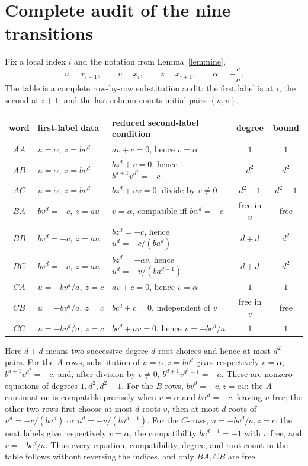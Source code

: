 \documentclass[11pt]{article}
\theoremstyle{definition}
\theoremstyle{remark}
\begin{document}
\appendix

\section{Complete audit of the nine transitions}\label{app:nine}

Fix a local index \(i\) and the notation from Lemma~\ref{lem:nine},
\[
 u=x_{i-1},\qquad v=x_i,\qquad z=x_{i+1},\qquad
 \alpha=-\frac ca.
\]
The table is a complete row-by-row substitution audit: the first label is
at \(i\), the second at \(i+1\), and the last column counts initial pairs
\((u,v)\).

\begin{center}
\small
\begin{tabular}{c p{2.7cm} p{5.0cm} c c}
\toprule
word & first-label data & reduced second-label condition & degree & bound\\
\midrule
\(AA\) & \(u=\alpha,\ z=bv^d\)
 & \(av+c=0\), hence \(v=\alpha\) & \(1\) & \(1\)\\
\(AB\) & \(u=\alpha,\ z=bv^d\)
 & \(bz^d+c=0\), hence \(b^{d+1}v^{d^2}=-c\) & \(d^2\) & \(d^2\)\\
\(AC\) & \(u=\alpha,\ z=bv^d\)
 & \(bz^d+av=0\); divide by \(v\ne0\) & \(d^2-1\) & \(d^2-1\)\\
\(BA\) & \(bv^d=-c,\ z=au\)
 & \(v=\alpha\), compatible iff \(b\alpha^d=-c\) & free in \(u\) & free\\
\(BB\) & \(bv^d=-c,\ z=au\)
 & \(bz^d=-c\), hence \(u^d=-c/(ba^d)\) & \(d+d\) & \(d^2\)\\
\(BC\) & \(bv^d=-c,\ z=au\)
 & \(bz^d=-av\), hence \(u^d=-v/(ba^{d-1})\) & \(d+d\) & \(d^2\)\\
\(CA\) & \(u=-bv^d/a,\ z=c\)
 & \(av+c=0\), hence \(v=\alpha\) & \(1\) & \(1\)\\
\(CB\) & \(u=-bv^d/a,\ z=c\)
 & \(bc^d+c=0\), independent of \(v\) & free in \(v\) & free\\
\(CC\) & \(u=-bv^d/a,\ z=c\)
 & \(bc^d+av=0\), hence \(v=-bc^d/a\) & \(1\) & \(1\)\\
\bottomrule
\end{tabular}
\end{center}

Here \(d+d\) means two successive degree-\(d\) root choices and hence at
most \(d^2\) pairs.  For the \(A\)-rows, substitution of
\(u=\alpha,z=bv^d\) gives respectively
\(v=\alpha\), \(b^{d+1}v^{d^2}=-c\), and, after division by
\(v\ne0\), \(b^{d+1}v^{d^2-1}=-a\).  These are nonzero equations of
degrees \(1,d^2,d^2-1\).  For the \(B\)-rows,
\(bv^d=-c,z=au\): the \(A\)-continuation is compatible precisely when
\(v=\alpha\) and \(b\alpha^d=-c\), leaving \(u\) free; the other two rows
first choose at most \(d\) roots \(v\), then at most \(d\) roots of
\(u^d=-c/(ba^d)\) or \(u^d=-v/(ba^{d-1})\).  For the \(C\)-rows,
\(u=-bv^d/a,z=c\): the next labels give respectively \(v=\alpha\), the
compatibility \(bc^{d-1}=-1\) with \(v\) free, and
\(v=-bc^d/a\).  Thus every equation, compatibility, degree, and root count
in the table follows without reversing the indices, and only \(BA,CB\)
are free.
\end{document}
